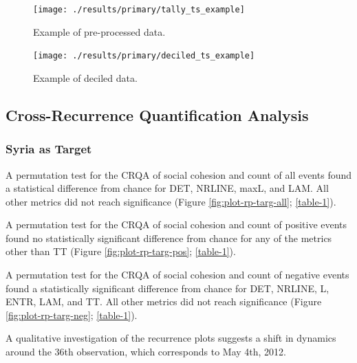 \documentclass[
  english,
  man]{apa6}
\begin{document}
\begin{figure}
\texttt{[image: ./results/primary/tally\_ts\_example]} \caption{Example of pre-processed data.}\label{fig:raw-ts}
\end{figure}

\begin{figure}
\texttt{[image: ./results/primary/deciled\_ts\_example]} \caption{Example of deciled data.}\label{fig:deciled-ts}
\end{figure}

\hypertarget{cross-recurrence-quantification-analysis-1}{%
\subsection{Cross-Recurrence Quantification Analysis}\label{cross-recurrence-quantification-analysis-1}}

\hypertarget{syria-as-target}{%
\subsubsection{Syria as Target}\label{syria-as-target}}

A permutation test for the CRQA of social cohesion and count of all events found
a statistical difference from chance for DET, NRLINE, maxL, and LAM. All other
metrics did not reach significance (Figure \ref{fig:plot-rp-targ-all};
\autoref{table-1}).

A permutation test for the CRQA of social cohesion and count of positive events
found no statistically significant difference from chance for any of the metrics
other than TT (Figure \ref{fig:plot-rp-targ-pos}; \autoref{table-1}).

A permutation test for the CRQA of social cohesion and count of negative events
found a statistically significant difference from chance for DET, NRLINE, L,
ENTR, LAM, and TT. All other metrics did not reach significance (Figure
\ref{fig:plot-rp-targ-neg}; \autoref{table-1}).

A qualitative investigation of the recurrence plots suggests a shift in dynamics
around the 36th observation, which corresponds to May 4th, 2012.
\end{document}
